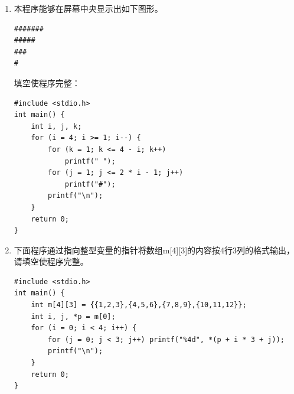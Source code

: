 \documentclass[a4paper,12pt]{article}
\begin{document}
\begin{enumerate}
	\item 本程序能够在屏幕中央显示出如下图形。
	      \begin{verbatim}
#######
#####
###
#
    \end{verbatim}
	      填空使程序完整：
	      \begin{verbatim}
#include <stdio.h>
int main() {
    int i, j, k;
    for (i = 4; i >= 1; i--) {
        for (k = 1; k <= 4 - i; k++)
            printf(" ");
        for (j = 1; j <= 2 * i - 1; j++)
            printf("#");
        printf("\n");
    }
    return 0;
}
    \end{verbatim}
	      \vspace{0.3cm}

	\item 下面程序通过指向整型变量的指针将数组m[4][3]的内容按4行3列的格式输出，请填空使程序完整。
	      \begin{verbatim}
#include <stdio.h>
int main() {
    int m[4][3] = {{1,2,3},{4,5,6},{7,8,9},{10,11,12}};
    int i, j, *p = m[0];
    for (i = 0; i < 4; i++) {
        for (j = 0; j < 3; j++) printf("%4d", *(p + i * 3 + j));
        printf("\n");
    }
    return 0;
}
    \end{verbatim}
	      \vspace{0.3cm}
\end{enumerate}
\end{document}
